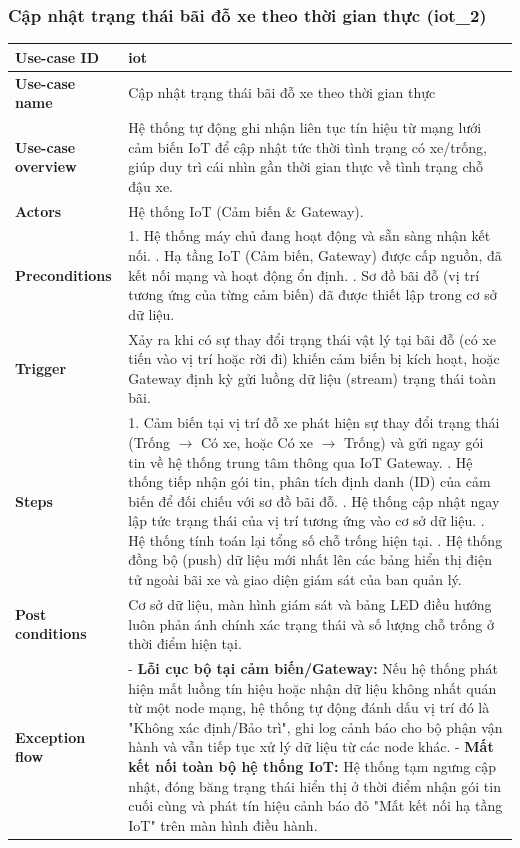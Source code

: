 \subsubsection{Cập nhật trạng thái bãi đỗ xe theo thời gian thực (iot\_2)}
\begingroup
\small
\begin{longtable}{|>{\centering\arraybackslash}m{3cm}|m{13.7cm}|}
\hline
\textbf{Use-case ID} & iot \\ \hline
\textbf{Use-case name} & Cập nhật trạng thái bãi đỗ xe theo thời gian thực \\ \hline
\textbf{Use-case overview} & Hệ thống tự động ghi nhận liên tục tín hiệu từ mạng lưới cảm biến IoT để cập nhật tức thời tình trạng có xe/trống, giúp duy trì cái nhìn gần thời gian thực về tình trạng chỗ đậu xe. \\ \hline
\textbf{Actors} & Hệ thống IoT (Cảm biến \& Gateway). \\ \hline
\textbf{Preconditions} & 
1. Hệ thống máy chủ đang hoạt động và sẵn sàng nhận kết nối. \newline
2. Hạ tầng IoT (Cảm biến, Gateway) được cấp nguồn, đã kết nối mạng và hoạt động ổn định. \newline
3. Sơ đồ bãi đỗ (vị trí tương ứng của từng cảm biến) đã được thiết lập trong cơ sở dữ liệu. \\ \hline
\textbf{Trigger} & Xảy ra khi có sự thay đổi trạng thái vật lý tại bãi đỗ (có xe tiến vào vị trí hoặc rời đi) khiến cảm biến bị kích hoạt, hoặc Gateway định kỳ gửi luồng dữ liệu (stream) trạng thái toàn bãi. \\ \hline
\textbf{Steps} & 
1. Cảm biến tại vị trí đỗ xe phát hiện sự thay đổi trạng thái (Trống $\rightarrow$ Có xe, hoặc Có xe $\rightarrow$ Trống) và gửi ngay gói tin về hệ thống trung tâm thông qua IoT Gateway. \newline
2. Hệ thống tiếp nhận gói tin, phân tích định danh (ID) của cảm biến để đối chiếu với sơ đồ bãi đỗ. \newline
3. Hệ thống cập nhật ngay lập tức trạng thái của vị trí tương ứng vào cơ sở dữ liệu. \newline
4. Hệ thống tính toán lại tổng số chỗ trống hiện tại. \newline
5. Hệ thống đồng bộ (push) dữ liệu mới nhất lên các bảng hiển thị điện tử ngoài bãi xe và giao diện giám sát của ban quản lý. \\ \hline
\textbf{Post conditions} & Cơ sở dữ liệu, màn hình giám sát và bảng LED điều hướng luôn phản ánh chính xác trạng thái và số lượng chỗ trống ở thời điểm hiện tại.\\ \hline
\textbf{Exception flow} & - \textbf{Lỗi cục bộ tại cảm biến/Gateway:} Nếu hệ thống phát hiện mất luồng tín hiệu hoặc nhận dữ liệu không nhất quán từ một node mạng, hệ thống tự động đánh dấu vị trí đó là "Không xác định/Bảo trì", ghi log cảnh báo cho bộ phận vận hành và vẫn tiếp tục xử lý dữ liệu từ các node khác.\newline
- \textbf{Mất kết nối toàn bộ hệ thống IoT:} Hệ thống tạm ngưng cập nhật, đóng băng trạng thái hiển thị ở thời điểm nhận gói tin cuối cùng và phát tín hiệu cảnh báo đỏ "Mất kết nối hạ tầng IoT" trên màn hình điều hành. \\ \hline
\end{longtable}
\endgroup

